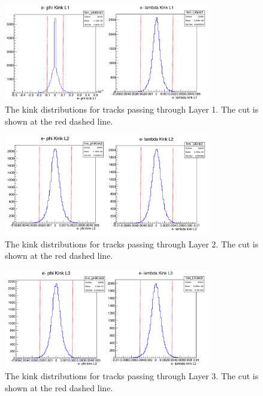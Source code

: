 \begin{figure}[htb]
  \centering
      \includegraphics[width=0.8\textwidth]{pics/appendix/kink1.png}
  \caption[Kink distributions for Layer 1]{The kink distributions for tracks passing through Layer 1. The cut is shown at the red dashed line.}
  \label{fig:kink1}
\end{figure} 
\begin{figure}[H]
  \centering
      \includegraphics[width=0.8\textwidth]{pics/appendix/kink2.png}
  \caption[Kink distributions for Layer 2]{The kink distributions for tracks passing through Layer 2. The cut is shown at the red dashed line.}
  \label{fig:kink2}
\end{figure} 
\begin{figure}[H]
  \centering
      \includegraphics[width=0.8\textwidth]{pics/appendix/kink3.png}
  \caption[Kink distributions for Layer 3]{The kink distributions for tracks passing through Layer 3. The cut is shown at the red dashed line.}
  \label{fig:kink3}
\end{figure} 
